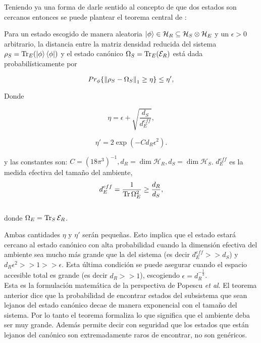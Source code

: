 Teniendo ya una forma de darle sentido al concepto de que dos estados son cercanos entonces se puede plantear el teorema central de \cite{Popescu2006}:
\\
\begin{theorem} \label{teorema principal}
Para un estado escogido de manera aleatoria $\ket{\phi} \in \mathcal{H}_{R} \subseteq \mathcal{H}_{S} \otimes \mathcal{H}_{E} $ y un $\epsilon > 0$ arbitrario, la distancia entre la matriz densidad reducida del sistema $\rho_{S}=\Tr_{E}(\ket{\phi} \bra{\phi})$  y el estado canónico $\Omega_{S}=\Tr_{E} ( \mathcal{E}_{R})$ está dada probabilísticamente por 

\begin{equation}
Pr_{\phi} \{  \norm{\rho_{S} -\Omega_{S}}_{1} \geq \eta \} \leq \eta',
\end{equation}

Donde 

\begin{equation}
\eta= \epsilon + \sqrt{ \frac{d_{S}}{d_{E}^{eff}} },
\end{equation}

\begin{equation}
\eta'=2\exp (-C d_{R} \epsilon^{2} ).
\end{equation}

y las constantes son: $ C=(18 \pi^{3})^{-1}, d_{R} = \dim \mathcal{H}_{R}, d_{S} = \dim \mathcal{H}_{S} $. $d_{E}^{eff}$ es la medida efectiva del tamaño del ambiente,
\begin{equation}
d_{E}^{eff}= \frac{1}{\Tr \Omega_{E}^{2}} \ge \frac{d_{R}}{d_{S}},
\end{equation}
\\
donde $\Omega_{E}= \Tr_{S} \mathcal{E}_{R}$.\\
\end{theorem}

Ambas cantidades $\eta $ y $\eta'$ serán pequeñas. Esto implica que el estado estará cercano al estado canónico con alta probabilidad cuando la dimensión efectiva del ambiente sea mucho más grande que la del sistema (es decir $d_{E}^{eff} >> d_{S}$) y  $d_{R}\epsilon^2>>1>>\epsilon$. Esta última condición se puede asegurar cuando el espacio accesible total es grande (es decir $d_{R}>>1$), escogiendo $\epsilon=d_{R}^{-\frac{1}{3}}$.\\
Esta es la formulación matemática de la perspectiva de Popescu \textit{et al}. El teorema anterior dice que la probabilidad de encontrar estados del subsistema que sean lejanos del estado canónico decae de manera exponencial con el tamaño del sistema. Por lo tanto el teorema formaliza lo que significa que el ambiente deba ser muy grande. Además permite decir con seguridad que los estados que están lejanos del canónico son extremadamente raros de encontrar, no son genéricos.
\\

